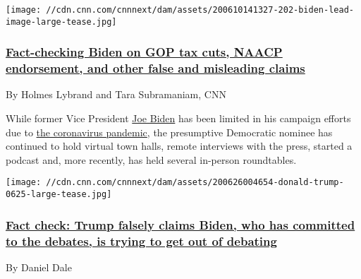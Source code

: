 \href{/2020/06/27/politics/joe-biden-fact-check-gop-tax-cuts-naacp-endorsement/index.html}{}

\texttt{[image: //cdn.cnn.com/cnnnext/dam/assets/200610141327-202-biden-lead-image-large-tease.jpg]}

\hypertarget{fact-checking-biden-on-gop-tax-cuts-naacp-endorsement-and-other-false-and-misleading-claims}{%
\subsubsection{\texorpdfstring{\href{/2020/06/27/politics/joe-biden-fact-check-gop-tax-cuts-naacp-endorsement/index.html}{Fact-checking
Biden on GOP tax cuts, NAACP endorsement, and other false and misleading
claims}}{Fact-checking Biden on GOP tax cuts, NAACP endorsement, and other false and misleading claims}}\label{fact-checking-biden-on-gop-tax-cuts-naacp-endorsement-and-other-false-and-misleading-claims}}

By Holmes Lybrand and Tara Subramaniam, CNN

While former Vice President
\href{https://www.cnn.com/election/2020/candidate/biden}{Joe Biden} has
been limited in his campaign efforts due to
\href{https://www.cnn.com/interactive/2020/health/coronavirus-us-maps-and-cases/}{the
coronavirus pandemic}, the presumptive Democratic nominee has continued
to hold virtual town halls, remote interviews with the press, started a
podcast and, more recently, has held several in-person roundtables.

\href{/2020/06/26/politics/fact-check-trump-biden-debates/index.html}{}

\texttt{[image: //cdn.cnn.com/cnnnext/dam/assets/200626004654-donald-trump-0625-large-tease.jpg]}

\hypertarget{fact-check-trump-falsely-claims-biden-who-has-committed-to-the-debates-is-trying-to-get-out-of-debating-}{%
\subsubsection{\texorpdfstring{\href{/2020/06/26/politics/fact-check-trump-biden-debates/index.html}{Fact
check: Trump falsely claims Biden, who has committed to the debates, is
trying to get out of debating
}}{Fact check: Trump falsely claims Biden, who has committed to the debates, is trying to get out of debating }}\label{fact-check-trump-falsely-claims-biden-who-has-committed-to-the-debates-is-trying-to-get-out-of-debating-}}

By Daniel Dale

